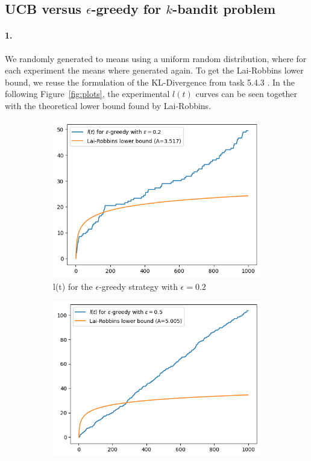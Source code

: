 \subsection{UCB versus $\epsilon$-greedy for $k$-bandit problem}

\paragraph{1.}
We randomly generated to means using a uniform random distribution,
where for each experiment the means where generated again.
To get the Lai-Robbins lower bound, we reuse the formulation of the KL-Divergence from task
5.4.3 . In the following Figure~\ref{fig:plots}, the experimental $l(t)$ curves can be seen together with the 
theoretical lower bound found by Lai-Robbins.
\begin{figure}[ht]
    \centering
    \begin{subfigure}{0.45\textwidth}
        \centering
        \includegraphics[scale=0.45]{figures/e02.png}
        \caption{l(t) for the $\epsilon$-greedy strategy with $\epsilon=0.2$}
    \end{subfigure}  
    \begin{subfigure}{0.45\textwidth}
        \centering
        \includegraphics[scale=0.45]{figures/e05.png}

\end{subfigure}
\end{figure}

